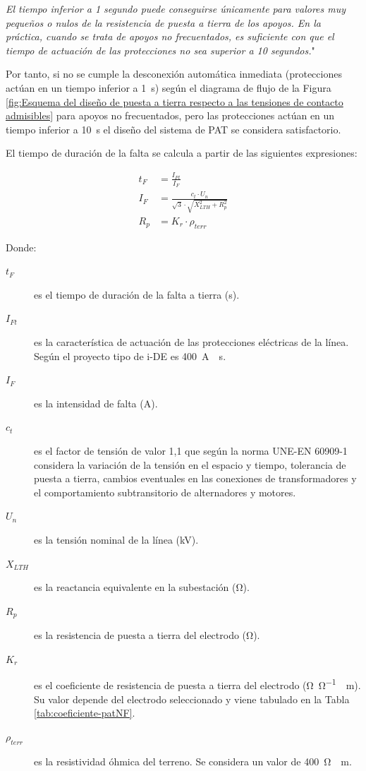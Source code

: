 \textit{El tiempo inferior a 1 segundo puede conseguirse únicamente para valores muy pequeños o nulos de la resistencia de puesta a tierra de los  apoyos. En la práctica, cuando se trata de apoyos no frecuentados, es suficiente con que el tiempo de actuación de las protecciones no sea superior a 10 segundos.}" 

Por tanto, si no se cumple la desconexión automática inmediata (protecciones actúan en un tiempo inferior a \SI{1}{\second}) según el diagrama de flujo de la Figura \ref{fig:Esquema del diseño de puesta a tierra respecto a las tensiones de contacto admisibles} para apoyos no frecuentados, pero las protecciones actúan en un tiempo inferior a \SI{10}{\second} el diseño del sistema de \ac{PAT} se considera satisfactorio.

El tiempo de duración de la falta se calcula a partir de las siguientes expresiones:

\begin{align}
    t_F &= \frac{I_{Ft}}{I_F}
    \label{eq:tiempo-pat}\\[0.5em]
    I_F &= \frac{c_t\cdot U_n}{\sqrt{3}\cdot\sqrt{X_{LTH}^2+R_p^2}}
    \label{eq:intensidad-pat}\\[0.5em]
    R_p &= K_r\cdot\rho_{terr}
    \label{eq:resistencia-pat}
\end{align}

Donde:
\begin{description}
    \item[$t_F$] es el tiempo de duración de la falta a tierra (\si{\second}).
    \item[$I_{Ft}$] es la característica de actuación de las protecciones eléctricas de la línea. Según el proyecto tipo de \ac{i-DE} es \SI{400}{\ampere\cdot\second}.
    \item[$I_F$] es la intensidad de falta (\si{\ampere}).
    \item[$c_t$] es el factor de tensión de valor 1,1 que según la norma UNE-EN 60909-1 considera la variación de la tensión en el espacio y tiempo, tolerancia de puesta a tierra, cambios eventuales en las conexiones de transformadores y el comportamiento subtransitorio de alternadores y motores.
    \item[$U_n$] es la tensión nominal de la línea (\si{\kilo\volt}).
    \item[$X_{LTH}$] es la reactancia equivalente en la subestación (\si{\ohm}).
    \item[$R_p$] es la resistencia de puesta a tierra del electrodo (\si{\ohm}).
    \item[$K_r$] es el coeficiente de resistencia de puesta a tierra del electrodo (\si{\ohm\per\ohm\cdot\meter}). Su valor depende del electrodo seleccionado y viene tabulado en la Tabla \ref{tab:coeficiente-patNF}.
    \item[$\rho_{terr}$] es la resistividad óhmica del terreno. Se considera un valor de \SI{400}{\ohm\cdot\meter}.
\end{description}

